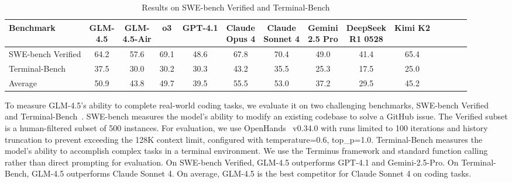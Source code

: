 \documentclass{article}
\theoremstyle{definition}
\begin{document}
\begin{table}[ht]
    \centering
    \footnotesize
    \caption{Results on SWE-bench Verified and Terminal-Bench}
    \begin{tabular}{@{}l@{\;\;}c@{\;\;\;}c@{\;\;\;}c@{\;\;}c@{\;\;\;}c@{\;\;\;}c@{\;\;\;}c@{\;\;\;}c@{\;\;\;}c@{\;\;\;}c@{\;\;\;}c@{\;\;\;}c@{\;}c@{}}
    \toprule
    Benchmark & \makecell[c]{\textbf{GLM-}\\\textbf{4.5}} & \makecell[c]{\textbf{GLM-}\\\textbf{4.5-Air}} & \textbf{o3} & \textbf{GPT-4.1} & \makecell[c]{\textbf{Claude}\\\textbf{Opus 4}} & \makecell[c]{\textbf{Claude}\\\textbf{Sonnet 4}} & \makecell[c]{\textbf{Gemini}\\\textbf{2.5 Pro}} & \makecell[c]{\textbf{DeepSeek}\\\textbf{R1 0528}} & \textbf{Kimi K2} \\
    \midrule
    SWE-bench Verified & 64.2 & 57.6 & 69.1 & 48.6 & 67.8 & 70.4 & 49.0 & 41.4 & 65.4 \\
    Terminal-Bench     & 37.5 & 30.0 & 30.2 & 30.3 & 43.2 & 35.5 & 25.3 & 17.5 & 25.0 \\
    \midrule
    Average & 50.9 & 43.8 & 49.7 & 39.5 & 55.5 & 53.0 & 37.2 & 29.5 & 45.2 \\
    \bottomrule
    \end{tabular}
    \label{tab:swe_terminal}
\end{table}

To measure GLM-4.5's ability to complete real-world coding tasks, we evaluate it on two challenging benchmarks, SWE-bench Verified~\cite{jimenez2023swe} and Terminal-Bench~\cite{tbench_2025}. SWE-bench measures the model's ability to modify an existing codebase to solve a GitHub issue. The Verified subset is a human-filtered subset of 500 instances. For evaluation, we use OpenHands~\cite{wang2025openhands} v0.34.0 with runs limited to 100 iterations and history truncation to prevent exceeding the 128K context limit, configured with temperature=0.6, top\_p=1.0. Terminal-Bench measures the model's ability to accomplish complex tasks in a terminal environment. We use the Terminus framework and standard function calling rather than direct prompting for evaluation. On SWE-bench Verified, GLM-4.5 outperforms GPT-4.1 and Gemini-2.5-Pro. On Terminal-Bench, GLM-4.5 outperforms Claude Sonnet 4. On average, GLM-4.5 is the best competitor for Claude Sonnet 4 on coding tasks.
\end{document}
